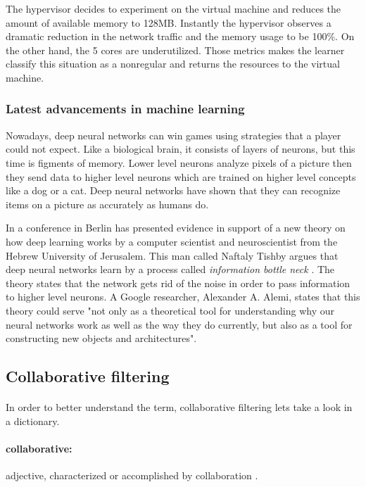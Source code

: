\begin{description}
	The hypervisor decides to experiment on the virtual machine and reduces the amount of available memory to 128MB. Instantly the hypervisor observes a dramatic reduction in the network traffic and the memory usage to be 100\%. On the other hand, the 5 cores are underutilized. Those metrics makes the learner classify this situation as a nonregular and returns the resources to the virtual machine.
	
\end{description}

\subsubsection{Latest advancements in machine learning}
Nowadays, deep neural networks can win games using strategies that a player could not expect. Like a biological brain, it consists of layers of neurons, but this time is figments of memory. Lower level neurons analyze pixels of a picture then they send data to higher level neurons which are trained on higher level concepts like a dog or a cat. Deep neural networks have shown that they can recognize items on a picture as accurately as humans do.

In a conference in Berlin has presented evidence in support of a new theory on how deep learning works by a computer scientist and neuroscientist from the Hebrew University of Jerusalem. This man called Naftaly Tishby argues that deep neural networks learn by a process called \textit{information bottle neck} \cite{tishby2000information}. The theory states that the network gets rid of the noise in order to pass information to higher level neurons. A Google researcher, Alexander A. Alemi, states that this theory could serve "not only as a theoretical tool for understanding why our neural networks work as well as the way they do currently, but also as a tool for constructing new objects and architectures".

\subsection{Collaborative filtering}
\paragraph{} In order to better understand the term, collaborative filtering lets take a look in a dictionary.
\paragraph{collaborative:} adjective, characterized or accomplished by collaboration \cite{Dictionary.com2017}.
